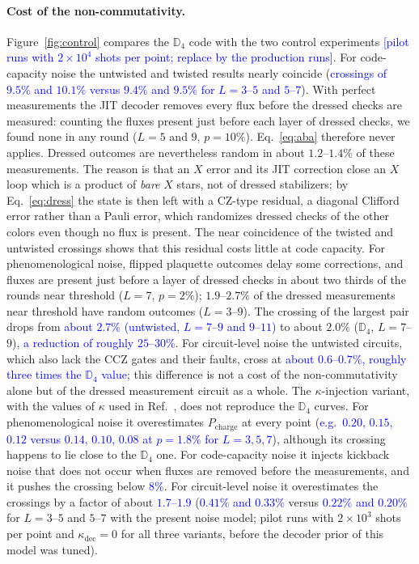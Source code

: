 \documentclass[a4paper]{article}
\newcommand{\blue}[1]{\textcolor{blue}{#1}}
\begin{document}
\paragraph{Cost of the non-commutativity.}
Figure~\ref{fig:control} compares the $\mathbb{D}_4$ code with the two control experiments \blue{[pilot runs with $2\times10^4$ shots per point; replace by the production runs]}. For code-capacity noise the untwisted and twisted results nearly coincide (\blue{crossings of $9.5\%$ and $10.1\%$ versus $9.4\%$ and $9.5\%$ for $L=3$--$5$ and $5$--$7$}). With perfect measurements the JIT decoder removes every flux before the dressed checks are measured: counting the fluxes present just before each layer of dressed checks, we found none in any round ($L=5$ and $9$, $p=10\%$). Eq.~\eqref{eq:aba} therefore never applies. Dressed outcomes are nevertheless random in about $1.2$--$1.4\%$ of these measurements. The reason is that an $X$ error and its JIT correction close an $X$ loop which is a product of \emph{bare} $X$ stars, not of dressed stabilizers; by Eq.~\eqref{eq:dress} the state is then left with a CZ-type residual, a diagonal Clifford error rather than a Pauli error, which randomizes dressed checks of the other colors even though no flux is present. The near coincidence of the twisted and untwisted crossings shows that this residual costs little at code capacity. For phenomenological noise, flipped plaquette outcomes delay some corrections, and fluxes are present just before a layer of dressed checks in about two thirds of the rounds near threshold ($L=7$, $p=2\%$); $1.9$--$2.7\%$ of the dressed measurements near threshold have random outcomes ($L=3$--$9$). The crossing of the largest pair drops from \blue{about $2.7\%$ (untwisted, $L=7$--$9$ and $9$--$11$)} to about $2.0\%$ ($\mathbb{D}_4$, $L=7$--$9$), \blue{a reduction of roughly $25$--$30\%$}. For circuit-level noise the untwisted circuits, which also lack the CCZ gates and their faults, cross at \blue{about $0.6$--$0.7\%$, roughly three times the $\mathbb{D}_4$ value}; this difference is not a cost of the non-commutativity alone but of the dressed measurement circuit as a whole. The $\kappa$-injection variant, with the values of $\kappa$ used in Ref.~\cite{haga2026aqis}, does not reproduce the $\mathbb{D}_4$ curves. For phenomenological noise it overestimates $P_{\mathrm{charge}}$ at every point (\blue{e.g.\ $0.20$, $0.15$, $0.12$ versus $0.14$, $0.10$, $0.08$ at $p=1.8\%$ for $L=3,5,7$}), although its crossing happens to lie close to the $\mathbb{D}_4$ one. For code-capacity noise it injects kickback noise that does not occur when fluxes are removed before the measurements, and it pushes the crossing below \blue{$8\%$}. For circuit-level noise it overestimates the crossings by a factor of about \blue{$1.7$--$1.9$} (\blue{$0.41\%$ and $0.33\%$} versus \blue{$0.22\%$ and $0.20\%$} for $L=3$--$5$ and $5$--$7$ with the present noise model; pilot runs with $2\times10^3$ shots per point and $\kappa_{\mathrm{dec}}=0$ for all three variants, before the decoder prior of this model was tuned).
\end{document}
